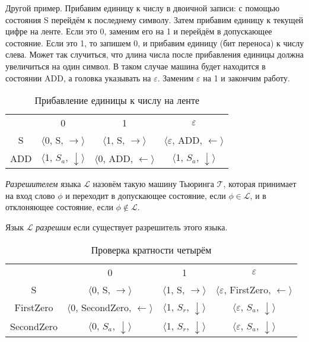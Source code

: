 Другой пример. Прибавим единицу к числу в двоичной записи: с помощью состояния S перейдём к последнему
символу. Затем прибавим единицу к текущей цифре на ленте. Если это 0, заменим его на 1 и перейдём в
допускающее состояние. Если это 1, то запишем 0, и прибавим единицу (бит переноса) к числу слева. Может
так случиться, что длина числа после прибавления единицы должна увеличиться на один символ. В таком
случае машина будет находится в состоянии ADD, а головка указывать на $\varepsilon$. Заменим
$\varepsilon$ на 1 и закончим работу.

\begin{table}[h]
    \centering
    \begin{tabular}{c c c c}
        & 0 & 1 & $\varepsilon$ \\
        
        S &
        $\langle$0, S, $\rightarrow\rangle$ & 
        $\langle$1, S, $\rightarrow\rangle$ & 
        $\langle\varepsilon$, ADD, $\leftarrow\rangle$ \\
        
        ADD &
        $\langle$1, $S_a$, $\downarrow\rangle$ &
        $\langle$0, ADD, $\leftarrow\rangle$ &
        $\langle$1, $S_a$, $\downarrow\rangle$ \\
        
    \end{tabular}
    \caption{Прибавление единицы к числу на ленте}
\end{table}

\begin{definition} \textit{Разрешителем} языка $\mathcal{L}$ назовём такую машину Тьюринга $\mathcal{T}$,
которая принимает на вход слово $\phi$ и переходит в допускающее состояние, если $\phi \in \mathcal{L}$,
и в отклоняющее состояние, если $\phi \notin \mathcal{L}$.
\end{definition} 

\begin{definition} Язык $\mathcal{L}$ \textit{разрешим} если существует разрешитель этого языка.
\end{definition} 

\begin{table}[h]
    \centering
    \begin{tabular}{c c c c}
        & 0 & 1 & $\varepsilon$ \\
        
        S &
        $\langle$0, S, $\rightarrow\rangle$ & 
        $\langle$1, S, $\rightarrow\rangle$ & 
        $\langle\varepsilon$, FirstZero, $\leftarrow\rangle$ \\
        
        FirstZero &
        $\langle$0, SecondZero, $\leftarrow\rangle$ &
        $\langle$1, $S_r$, $\downarrow\rangle$ &
        $\langle\varepsilon$, $S_a$, $\downarrow\rangle$ \\
        
        SecondZero &
        $\langle$0, $S_a$, $\downarrow\rangle$ &
        $\langle$1, $S_r$, $\downarrow\rangle$ &
        $\langle\varepsilon$, $S_a$, $\downarrow\rangle$ \\
    \end{tabular}
    \caption{Проверка кратности четырём}
\end{table}

